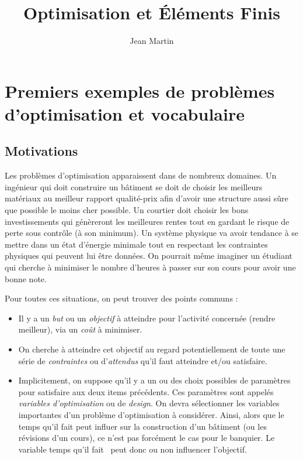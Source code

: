\documentclass[grape]{../ceri/sty/MasterNotes}
\title{Optimisation et Éléments Finis}
\author{Jean Martin}
\date{\the\year}
\begin{document}
\maketitle

\mainmatter



\chapter[Exemples et vocabulaire]{Premiers exemples de problèmes d'optimisation et vocabulaire}

\section{Motivations}

Les problèmes d'optimisation apparaissent dans de nombreux domaines. Un ingénieur qui doit construire un bâtiment se doit de choisir les meilleurs matériaux au meilleur rapport qualité-prix afin d'avoir une structure aussi sûre que possible le moins cher possible. Un courtier doit choisir les bons investissements qui génèreront les meilleures rentes tout en gardant le risque de perte sous contrôle (à son minimum). Un système physique va avoir tendance à se mettre dans un état d'énergie minimale tout en respectant les contraintes physiques qui peuvent lui être données. On pourrait même imaginer un étudiant qui cherche à minimiser le nombre d'heures à passer sur son cours pour avoir une bonne note.

Pour toutes ces situations, on peut trouver des points communs :
\begin{itemize}[wide]
    \item Il y a un \textit{but} ou un \textit{objectif} à atteindre pour l'activité concernée (rendre meilleur), via un \textit{coût} à minimiser.
    \item On cherche à atteindre cet objectif au regard potentiellement de toute une série de \textit{contraintes} ou d'\textit{attendus} qu'il faut atteindre et/ou satisfaire.
    \item Implicitement, on suppose qu'il y a un ou des choix possibles de paramètres pour satisfaire aux deux items précédents. Ces paramètres sont appelés \textit{variables d'optimisation} ou de \textit{design}. On devra sélectionner les variables importantes d'un problème d'optimisation à considérer. Ainsi, alors que le temps qu'il fait peut influer sur la construction d'un bâtiment (ou les révisions d'un cours), ce n'est pas forcément le cas pour le banquier. Le variable \og temps qu'il fait \fg\ peut donc ou non influencer l'objectif.
\end{itemize}
\end{document}
